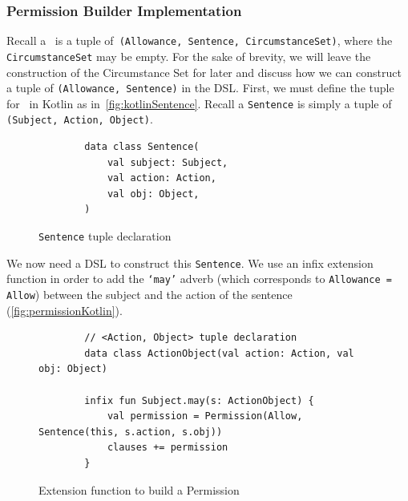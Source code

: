 \subsubsection{Permission Builder Implementation}

Recall a~ is a tuple of~\texttt{(Allowance, Sentence, CircumstanceSet)}, where the \texttt{CircumstanceSet} may be empty.
For the sake of brevity, we will leave the construction of the Circumstance Set for later and discuss how we can construct a tuple of \texttt{(Allowance, Sentence)} in the DSL.
First, we must define the tuple for~ in Kotlin as in~\autoref{fig:kotlinSentence}.
Recall a \texttt{Sentence} is simply a tuple of \texttt{(Subject, Action, Object)}.

\begin{figure}[h]
    \centering
    \begin{minipage}{0.4\textwidth}
        \begin{verbatim}
        data class Sentence(
            val subject: Subject,
            val action: Action,
            val obj: Object,
        )
        \end{verbatim}
    \end{minipage}
    \caption{\texttt{Sentence} tuple declaration}\label{fig:kotlinSentence}
\end{figure}

We now need a DSL to construct this \texttt{Sentence}.
We use an infix extension function in order to add the \texttt{`may'} adverb (which corresponds to \texttt{Allowance = Allow}) between the subject and the action of the sentence (\autoref{fig:permissionKotlin}).



\begin{figure}[h]
    \centering
    \begin{minipage}{\textwidth}
        \begin{verbatim}
        // <Action, Object> tuple declaration
        data class ActionObject(val action: Action, val obj: Object)

        infix fun Subject.may(s: ActionObject) {
            val permission = Permission(Allow, Sentence(this, s.action, s.obj))
            clauses += permission
        }
        \end{verbatim}
    \end{minipage}
    \caption{Extension function to build a Permission}\label{fig:permissionKotlin}
\end{figure}



